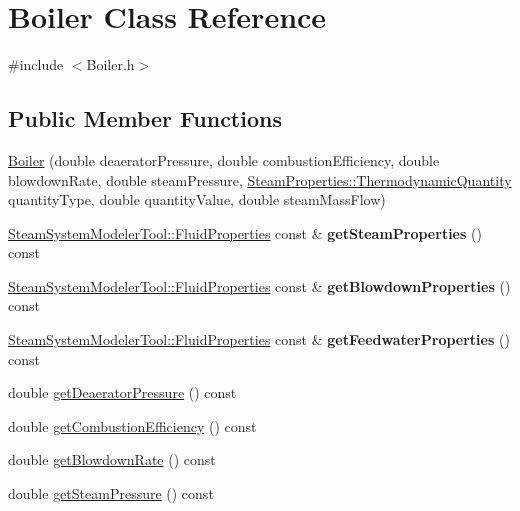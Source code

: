 \hypertarget{class_boiler}{}\section{Boiler Class Reference}
\label{class_boiler}


{\ttfamily \#include $<$Boiler.\+h$>$}

\subsection*{Public Member Functions}
\begin{DoxyCompactItemize}
\item 
\hyperlink{class_boiler_adebe1dca06edc8dbca462e226b4dd9d5}{Boiler} (double deaerator\+Pressure, double combustion\+Efficiency, double blowdown\+Rate, double steam\+Pressure, \hyperlink{class_steam_properties_ae0294bedf7d178c2d8fb6aed0f62fbff}{Steam\+Properties\+::\+Thermodynamic\+Quantity} quantity\+Type, double quantity\+Value, double steam\+Mass\+Flow)
\item 
\mbox{\label{class_boiler_a47e660b470ef7c2749102ae6873922e1}} 
\hyperlink{struct_steam_system_modeler_tool_1_1_fluid_properties}{Steam\+System\+Modeler\+Tool\+::\+Fluid\+Properties} const  \& {\bfseries get\+Steam\+Properties} () const
\item 
\mbox{\label{class_boiler_ac48aa3ee13845cdf388085e73531cb66}} 
\hyperlink{struct_steam_system_modeler_tool_1_1_fluid_properties}{Steam\+System\+Modeler\+Tool\+::\+Fluid\+Properties} const  \& {\bfseries get\+Blowdown\+Properties} () const
\item 
\mbox{\label{class_boiler_a03e09f9469c746789f302c42c8dfe959}} 
\hyperlink{struct_steam_system_modeler_tool_1_1_fluid_properties}{Steam\+System\+Modeler\+Tool\+::\+Fluid\+Properties} const  \& {\bfseries get\+Feedwater\+Properties} () const
\item 
double \hyperlink{class_boiler_aad4786e7b68084e65a35dd6235517b8c}{get\+Deaerator\+Pressure} () const
\item 
double \hyperlink{class_boiler_a21c7423b756761c3216704b3f554feff}{get\+Combustion\+Efficiency} () const
\item 
double \hyperlink{class_boiler_aec9bf6eeed82d8d5f35284c65a3986e7}{get\+Blowdown\+Rate} () const
\item 
double \hyperlink{class_boiler_a99d4bbace6ef20bcbdc4b0cfcdc43213}{get\+Steam\+Pressure} () const

\end{DoxyCompactItemize}

